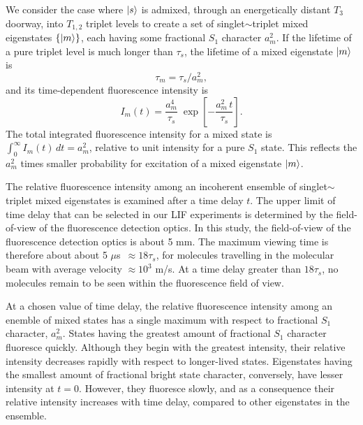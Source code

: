 \documentclass[12pt]{mitthesis}
\newcommand{\microsec}{$\mu$s}
\begin{document}
We consider the case where $\mathinner{|{s}\rangle}$ is admixed, through an
energetically distant $T_3$ doorway, into $T_{1,2}$ triplet levels to
create a set of singlet$\sim$triplet mixed eigenstates $\lbrace
\mathinner{|{m}\rangle} \rbrace$, each having some fractional $S_1$ character $a_m^2$.
If the lifetime of a pure triplet level is much longer than $\tau_s$,
the lifetime of a mixed eigenstate $\mathinner{|{m}\rangle}$ is
\begin{equation}
  \label{eq:tau-m}
  \tau_m = \tau_s / a_m^2,
\end{equation}
and its time-dependent fluorescence intensity is
\begin{equation}
  \label{eq:int-m}
  I_m(t) = \frac{a_m^4}{\tau_s} \;
           \exp \left[
             -\frac{a_m^2 \, t}{\tau_s} 
           \right].
\end{equation}
The total integrated fluorescence intensity for a mixed state is
$\int_0^{\infty} I_m(t) \, dt = a_m^2$, relative to unit intensity for
a pure $S_1$ state.  This reflects the $a_m^2$ times smaller
probability for excitation of a mixed eigenstate $\mathinner{|{m}\rangle}$.

The relative fluorescence intensity among an incoherent ensemble of
singlet$\sim$triplet mixed eigenstates is examined after a time delay
$t$.  The upper limit of time delay that can be selected in our LIF
experiments is determined by the field-of-view of the fluorescence
detection optics.  In this study, the field-of-view of the
fluorescence detection optics is about 5 mm.  The maximum viewing time
is therefore about about 5 \microsec\ $\approx 18\tau_s$, for
molecules travelling in the molecular beam with average velocity
$\approx 10^3$ m/s.  At a time delay greater than $18\tau_s$, no
molecules remain to be seen within the fluorescence field of view.

At a chosen value of time delay, the relative fluorescence intensity
among an enemble of mixed states has a single maximum with respect to
fractional $S_1$ character, $a_m^2$.  States having the
greatest amount of fractional $S_1$ character fluoresce
quickly.  Although they begin with the greatest intensity, their
relative intensity decreases rapidly with respect to longer-lived
states.  Eigenstates having the smallest amount of fractional bright
state character, conversely, have lesser intensity at $t=0$.  However,
they fluoresce slowly, and as a consequence their relative intensity
increases with time delay, compared to other eigenstates in the
ensemble.
\end{document}
